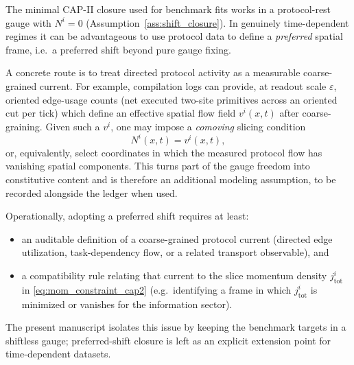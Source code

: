 The minimal CAP-II closure used for benchmark fits works in a protocol-rest gauge with $N^i=0$ (Assumption~\ref{ass:shift_closure}).
In genuinely time-dependent regimes it can be advantageous to use protocol data to define a \emph{preferred} spatial frame, i.e.\ a preferred shift beyond pure gauge fixing.
\par
\noindent A concrete route is to treat directed protocol activity as a measurable coarse-grained current.
For example, compilation logs can provide, at readout scale $\varepsilon$, oriented edge-usage counts (net executed two-site primitives across an oriented cut per tick) which define an effective spatial flow field $v^i(x,t)$ after coarse-graining.
Given such a $v^i$, one may impose a \emph{comoving} slicing condition
\begin{equation}
  N^i(x,t) = v^i(x,t),
\end{equation}
or, equivalently, select coordinates in which the measured protocol flow has vanishing spatial components.
This turns part of the gauge freedom into constitutive content and is therefore an additional modeling assumption, to be recorded alongside the ledger when used.
\par
\noindent Operationally, adopting a preferred shift requires at least:
\begin{itemize}
  \item an auditable definition of a coarse-grained protocol current (directed edge utilization, task-dependency flow, or a related transport observable), and
  \item a compatibility rule relating that current to the slice momentum density $j^i_{\mathrm{tot}}$ in \eqref{eq:mom_constraint_cap2} (e.g.\ identifying a frame in which $j^i_{\mathrm{tot}}$ is minimized or vanishes for the information sector).
\end{itemize}
The present manuscript isolates this issue by keeping the benchmark targets in a shiftless gauge; preferred-shift closure is left as an explicit extension point for time-dependent datasets.


